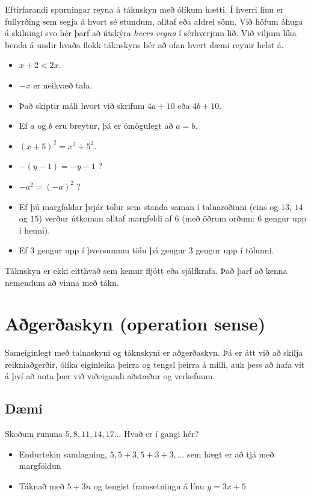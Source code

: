 \documentclass[
  icelandic,
]{book}
\providecommand{\tightlist}{%
  \setlength{\itemsep}{0pt}\setlength{\parskip}{0pt}}
\begin{document}
Eftirfarandi spurningar reyna á táknskyn með ólíkum hætti. Í hverri línu er fullyrðing sem segja á hvort sé stundum, alltaf eða aldrei sönn. Við höfum áhuga á skilningi svo hér þarf að útskýra \emph{hvers vegna} í sérhverjum lið. Við viljum líka benda á undir hvaða flokk táknskyns hér að ofan hvert dæmi reynir helst á.

\begin{itemize}
\tightlist
\item
  \(x+2 < 2x\).
\item
  \(-x\) er neikvæð tala.
\item
  Það skiptir máli hvort við skrifum \(4a+10\) eða \(4b+10\).
\item
  Ef \(a\) og \(b\) eru breytur, þá er ómögulegt að \(a=b\).
\item
  \((x+5)^2 = x^2 + 5^2\).
\item
  \(-(y-1) = -y -1\) ?
\item
  \(-a^2 = (-a)^2\) ?
\item
  Ef þú margfaldar þrjár tölur sem standa saman í talnaröðinni (eins og \(13\), \(14\) og \(15\)) verður útkoman alltaf margfeldi af \(6\) (með öðrum orðum: \(6\) gengur upp í henni).
\item
  Ef \(3\) gengur upp í þversummu tölu þá gengur \(3\) gengur upp í tölunni.
\end{itemize}

Táknskyn er ekki eitthvað sem kemur fljótt eða sjálfkrafa. Það þarf að kenna nemendum að vinna með tákn.

\section{Aðgerðaskyn (operation sense)}\label{auxf0geruxf0askyn-operation-sense}

Sameiginlegt með talnaskyni og táknskyni er aðgerðaskyn. Þá er átt við að skilja reikniaðgerðir, ólíka eiginleika þeirra og tengsl þeirra á milli, auk þess að hafa vit á því að nota þær við viðeigandi aðstæður og verkefnum.

\subsection{Dæmi}\label{duxe6mi-1}

Skoðum rununa \(5, 8, 11, 14, 17...\) Hvað er í gangi hér?

\begin{itemize}
\tightlist
\item
  Endurtekin samlagning, \(5, 5+3, 5+3+3, ...\) sem hægt er að tjá með margföldun
\item
  Táknað með \(5 + 3n\) og tengist framsetningu á línu \(y = 3x+5\)
\end{itemize}
\end{document}
